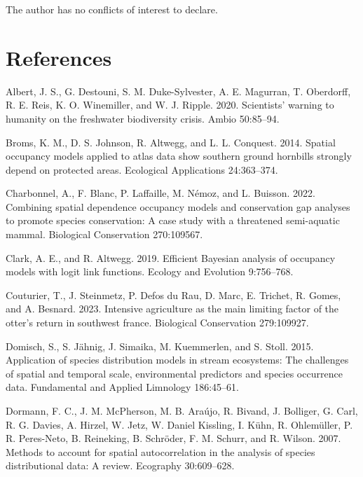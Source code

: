 \documentclass[
  11pt,
  a4paper,
]{article}
\newlength{\cslhangindent}
\newenvironment{CSLReferences}[2] %
 {\begin{list}{}{%
  \setlength{\itemindent}{0pt}
  \setlength{\leftmargin}{0pt}
  \setlength{\parsep}{0pt}
  \ifodd #1
   \setlength{\leftmargin}{\cslhangindent}
   \setlength{\itemindent}{-1\cslhangindent}
  \fi
  \setlength{\itemsep}{#2\baselineskip}}}
 {\end{list}}
\begin{document}
The author has no conflicts of interest to declare.

\section{References}\label{references}

\label{refs}
\begin{CSLReferences}{1}{0}
Albert, J. S., G. Destouni, S. M. Duke-Sylvester, A. E. Magurran, T. Oberdorff, R. E. Reis, K. O. Winemiller, and W. J. Ripple. 2020. Scientists' warning to humanity on the freshwater biodiversity crisis. Ambio 50:85--94.

Broms, K. M., D. S. Johnson, R. Altwegg, and L. L. Conquest. 2014. Spatial occupancy models applied to atlas data show southern ground hornbills strongly depend on protected areas. Ecological Applications 24:363--374.

Charbonnel, A., F. Blanc, P. Laffaille, M. Némoz, and L. Buisson. 2022. Combining spatial dependence occupancy models and conservation gap analyses to promote species conservation: A case study with a threatened semi-aquatic mammal. Biological Conservation 270:109567.

Clark, A. E., and R. Altwegg. 2019. Efficient {B}ayesian analysis of occupancy models with logit link functions. Ecology and Evolution 9:756--768.

Couturier, T., J. Steinmetz, P. Defos du Rau, D. Marc, E. Trichet, R. Gomes, and A. Besnard. 2023. Intensive agriculture as the main limiting factor of the otter's return in southwest france. Biological Conservation 279:109927.

Domisch, S., S. Jähnig, J. Simaika, M. Kuemmerlen, and S. Stoll. 2015. Application of species distribution models in stream ecosystems: The challenges of spatial and temporal scale, environmental predictors and species occurrence data. Fundamental and Applied Limnology 186:45--61.

Dormann, F. C., J. M. McPherson, M. B. Araújo, R. Bivand, J. Bolliger, G. Carl, R. G. Davies, A. Hirzel, W. Jetz, W. Daniel Kissling, I. Kühn, R. Ohlemüller, P. R. Peres-Neto, B. Reineking, B. Schröder, F. M. Schurr, and R. Wilson. 2007. Methods to account for spatial autocorrelation in the analysis of species distributional data: A review. Ecography 30:609--628.


\end{CSLReferences}
\end{document}
